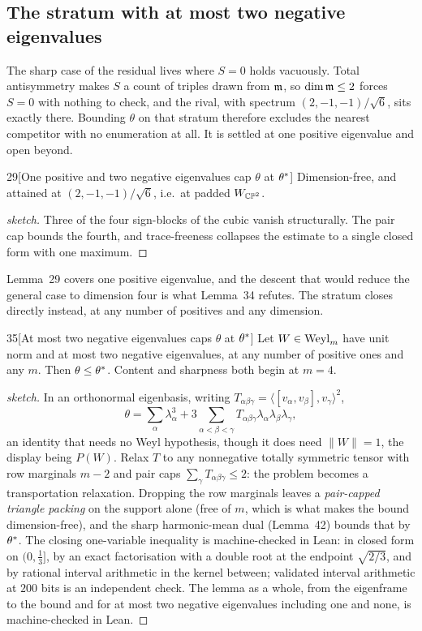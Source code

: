 \subsection{The stratum with at most two negative eigenvalues}\label{sec:stratum}

The sharp case of the residual lives where $S=0$ holds vacuously. Total antisymmetry makes $S$ a count of triples drawn from $\mathfrak{m}$, so $\dim\mathfrak{m}\le2$ forces $S=0$ with nothing to check, and the rival, with spectrum $(2,-1,-1)/\sqrt6$, sits exactly there. Bounding $\theta$ on that stratum therefore excludes the nearest competitor with no enumeration at all. It is settled at one positive eigenvalue and open beyond.

\begin{Lem}{29}[One positive and two negative eigenvalues cap $\theta$ at $\theta^{*}$]
Dimension-free, and attained at $(2,-1,-1)/\sqrt6$, i.e.\ at padded $W_{\mathbb{CP}^2}$.
\end{Lem}

\begin{proof}[sketch]
Three of the four sign-blocks of the cubic vanish structurally. The pair cap bounds the fourth, and trace-freeness collapses the estimate to a single closed form with one maximum.
\end{proof}

Lemma~29 covers one positive eigenvalue, and the descent that would reduce the general case to dimension four is what Lemma~34 refutes. The stratum closes directly instead, at any number of positives and any dimension.

\begin{Lem}{35}[At most two negative eigenvalues caps $\theta$ at $\theta^{*}$]
Let $W\in\mathrm{Weyl}_m$ have unit norm and at most two negative eigenvalues, at any number of positive ones and any $m$. Then $\theta\le\theta^{*}$. Content and sharpness both begin at $m=4$.
\end{Lem}

\begin{proof}[sketch]
In an orthonormal eigenbasis, writing $T_{\alpha\beta\gamma}=\langle[v_\alpha,v_\beta],v_\gamma\rangle^2$,
\[
\theta=\sum_\alpha\lambda_\alpha^3+3\!\!\sum_{\alpha<\beta<\gamma}\!\!T_{\alpha\beta\gamma}\lambda_\alpha\lambda_\beta\lambda_\gamma,
\]
an identity that needs no Weyl hypothesis, though it does need $\lVert W\rVert=1$, the display being $P(W)$. Relax $T$ to any nonnegative totally symmetric tensor with row marginals $m-2$ and pair caps $\sum_\gamma T_{\alpha\beta\gamma}\le2$: the problem becomes a transportation relaxation. Dropping the row marginals leaves a \emph{pair-capped triangle packing} on the support alone (free of $m$, which is what makes the bound dimension-free), and the sharp harmonic-mean dual (Lemma~42) bounds that by $\theta^{*}$. The closing one-variable inequality is machine-checked in Lean: in closed form on $(0,\tfrac13]$, by an exact factorisation with a double root at the endpoint $\sqrt{2/3}$, and by rational interval arithmetic in the kernel between; validated interval arithmetic at $200$ bits is an independent check. The lemma as a whole, from the eigenframe to the bound and for at most two negative eigenvalues including one and none, is machine-checked in Lean.
\end{proof}

